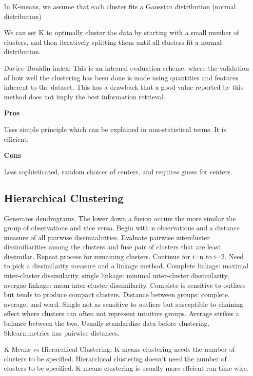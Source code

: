 \documentclass[]{book}
\begin{document}
In K-means, we assume that each cluster fits a Gaussian distribution (normal distribution)

We can set K to optimally cluster the data by starting with a small number of clusters, and then iteratively splitting them until all clusters fit a normal distribution.

Davies--Bouldin index: This is an internal evaluation scheme, where the validation of how well the clustering has been done is made using quantities and features inherent to the dataset. This has a drawback that a good value reported by this method does not imply the best information retrieval.

\textbf{Pros}

Uses simple principle which can be explained in non-statistical terms. It is efficient.

\textbf{Cons}

Less sophisticated, random choices of centers, and requires guess for centers.

\hypertarget{hierarchical-clustering}{%
\subsection{Hierarchical Clustering}\label{hierarchical-clustering}}

Generates dendrograms. The lower down a fusion occurs the more similar the group of observations and vice versa. Begin with n observations and a distance measure of all pairwise dissimialirities. Evaluate pairwise intercluster dissimiliarities among the clusters and fuse pair of clusters that are least dissimilar. Repeat process for remaining clusters. Continue for i=n to i=2.
Need to pick a dissimilarity measure and a linkage method. Complete linkage: maximal inter-cluster dissimilarity, single linkage: minimal inter-cluster dissimilarity, avergae linkage: mean inter-cluster dissimilarity. Complete is sensitive to outliers but tends to produce compact clusters. Distance between groups: complete, average, and ward. Single not as sensitive to outliers but susceptible to chaining effect where clusters can often not represent intuitive groups. Average strikes a balance between the two. Usually standardize data before clustering. Sklearn.metrics has pairwise distances.

K-Means vs Hierarchical Clustering: K-means clustering needs the number of clusters to be speciﬁed. Hierarchical clustering doesn't need the number of clusters to be speciﬁed. K-means clustering is usually more effcient run-time wise.
\end{document}
